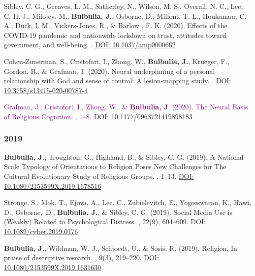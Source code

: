 \documentclass{article}
\begin{document}
\begin{thebibliography}{99}
 Sibley, C. G., Greaves, L. M., Satherley, N., Wilson, M. S., Overall, N. C., Lee, C. H. J., Milojev, M., {\bf Bulbulia, J.}, Osborne, D., Milfont, T. L., Houkamau, C. A., Duck, I. M., Vickers-Jones, R., \& Barlow , F. K. (2020).
\newblock Effects of the COVID-19 pandemic and nationwide lockdown on trust, attitudes toward government, and well-being. 
.
\href{http://dx.doi.org/10.1037/amp0000662}{DOI: 10.1037/amp0000662}


 Cohen-Zimerman, S., Cristofori, I., Zhong, W., {\bf Bulbulia, J.}, Krueger, F., Gordon, B., \& Grafman, J. (2020).
\newblock Neural underpinning of a personal relationship with God and sense of control: A lesion-mapping study.
.
\href{https://doi.org/10.3758/s13415-020-00787-4}{DOI: 10.3758/s13415-020-00787-4}


 \textcolor{purple}{ Grafman, J., Cristofori, I., Zhong, W., \& {\bf Bulbulia, J}. (2020).
\newblock The Neural Basis of Religious Cognition.
, 1--8.
\href{https://doi.org/10.1177/0963721419898183}{DOI: 10.1177/0963721419898183}}



\subsubsection*{2019}



 {\bf Bulbulia, J.}, Troughton, G., Highland, B., \& Sibley, C. G.  (2019).
\newblock A National-Scale Typology of Orientations to Religion Poses New Challenges for The Cultural Evolutionary Study of Religious Groups. 
, 1--13. 
\href{https://doi.org/10.1080/2153599X.2019.1678516}{DOI: 10.1080/2153599X.2019.1678516}


 Stronge, S., Mok, T., Ejova, A., Lee, C., Zubielevitch, E., Yogeeswaran, K., Hawi, D., Osborne,~D., {\bf Bulbulia, J.}, \& Sibley, C. G. (2019).
\newblock Social Media Use is (Weakly) Related to Psychological Distress. 
, 22(9), 604--609.
\href{https://doi.org/10.1089/cyber.2019.0176}{DOI: 10.1089/cyber.2019.0176}


{\bf  Bulbulia, J.}, Wildman, W. J., Schjoedt, U., \& Sosis, R. (2019).
\newblock Religion, In praise of descriptive research.  
, 9(3), 219--220. 
\href{https://doi.org/10.1080/2153599X.2019.1631630}{DOI: 10.1080/2153599X.2019.1631630}



\end{thebibliography}
\end{document}
